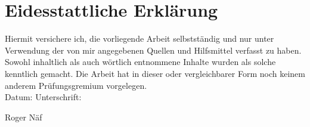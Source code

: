 \thispagestyle{empty}
\section*{Eidesstattliche Erklärung}
\label{Sec:Eidesstattliche Erklärung}

Hiermit versichere ich, die vorliegende Arbeit selbstständig und nur unter Verwendung der von mir angegebenen Quellen und Hilfsmittel verfasst zu haben. Sowohl inhaltlich als auch wörtlich entnommene Inhalte wurden als solche kenntlich gemacht. Die Arbeit hat in dieser oder vergleichbarer Form noch keinem anderem Prüfungsgremium vorgelegen. \\
[1.5cm]
Datum:	\hrulefill\enspace Unterschrift: \hrulefill
\\
\begin{flushright}
Roger Näf \\[1.5cm]
\end{flushright}
